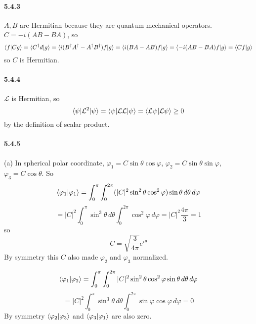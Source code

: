\documentclass[a4paper]{article}
\begin{document}
\paragraph{5.4.3}
$A,B$ are Hermitian because they are quantum mechanical operators. $C=-i(AB-BA)$, so
\[
\langle f|Cg\rangle=\langle C^\dagger d|g\rangle=\langle i(B^\dagger A^\dagger-A^\dagger B^\dagger)f|g\rangle=\langle i(BA-AB)f|g\rangle=\langle-i(AB-BA)f|g\rangle=\langle Cf|g\rangle
\]
so $C$ is Hermitian.

\paragraph{5.4.4}
$\mathcal{L}$ is Hermitian, so
\[
\langle\psi|\mathcal{L}^2|\psi\rangle=\langle\psi|\mathcal{L}\mathcal{L}|\psi\rangle=\langle\mathcal{L}\psi|\mathcal{L}\psi\rangle\geq0
\]
by the definition of scalar product.

\paragraph{5.4.5}
(a) In spherical polar coordinate, $\varphi_1=C\sin\theta\cos\varphi$, $\varphi_2=C\sin\theta\sin\varphi$, $\varphi_3=C\cos\theta$. So
\[
\langle\varphi_1|\varphi_1\rangle=\int_0^\pi\int_0^{2\pi}(|C|^2\sin^2\theta\cos^2\varphi)\sin\theta\, d\theta\,d\varphi
\]
\[
=|C|^2\int_0^\pi\sin^3\theta\,d\theta\int_0^{2\pi}\cos^2\varphi\,d\varphi=|C|^2\frac{4\pi}{3}=1
\]
so 
\[
C=\sqrt{\frac{3}{4\pi}}e^{i\theta}
\]
By symmetry this $C$ also made $\varphi_2$ and $\varphi_3$ normalized.

\[
\langle\varphi_1|\varphi_2\rangle=\int_0^\pi\int_0^{2\pi}|C|^2\sin^2\theta\cos^2\varphi\sin\theta\,d\theta\,d\varphi
\]
\[
=|C|^2\int_0^\pi\sin^3\theta\,d\theta\int_0^{2\pi}\sin\varphi\cos\varphi\,d\varphi=0
\]
By symmetry $\langle\varphi_2|\varphi_3\rangle$ and $\langle\varphi_3|\varphi_1\rangle$ are also zero.
\medskip
\end{document}
